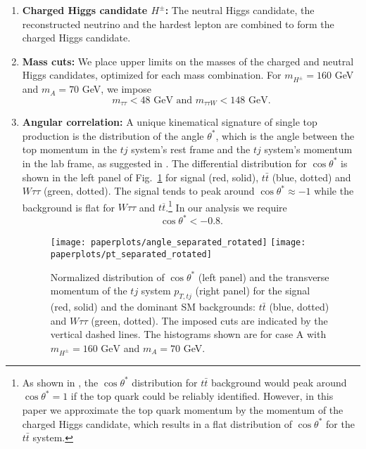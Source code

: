 \begin{enumerate}
\item \textbf{Charged Higgs candidate $H^{\pm}$:} The neutral Higgs candidate, the reconstructed neutrino and the hardest lepton are combined to form the charged Higgs candidate. 

\item \textbf{Mass cuts:} We place upper limits on the masses of the charged and neutral Higgs candidates, optimized for each mass combination. For $m_{H^{\pm}}=160$ GeV and $m_{A}= 70$ GeV, we impose 
\begin{equation}
m_{\tau\tau} < 48 \text{ GeV and } m_{\tau\tau W} < 148 \text{ GeV.}
\label{eqMASS}
\end{equation}
 

 \item \textbf{Angular correlation:} A unique kinematical signature of single top production is the distribution of the angle $\theta^{*}$, which is the angle between the top momentum in the $tj$ system's rest frame and the $tj$ system's momentum in the lab frame, as suggested in \cite{Kling:2012up}. The differential distribution for $\cos\theta^{*}$ is shown in the left panel of Fig.~\ref{fig:fig3} for signal (red, solid), $t\bar{t}$ (blue, dotted) and $W\tau\tau$ (green, dotted). The signal tends to peak around $\cos\theta^* \approx -1$ while the background is flat for $W\tau\tau$ and $t\overline{t}$.\footnote{As shown in \cite{Kling:2012up}, the $\cos\theta^{*}$ distribution for $t\bar{t}$ background would peak around $\cos\theta^{*}=1$ if the top quark could be reliably identified. However, in this paper we approximate the top quark momentum by the momentum of the charged Higgs candidate, which results in a flat distribution of $\cos\theta^*$ for the $t\bar{t}$ system. } In our analysis we require 
\begin{equation}
 \cos\theta^*< -0.8.
\label{eqT}
\end{equation}

\begin{figure}[htbp]
\centering
\texttt{[image: paperplots/angle\_separated\_rotated]}\hfill
 \texttt{[image: paperplots/pt\_separated\_rotated]}
 \caption{Normalized distribution of $\cos\theta^*$ (left panel) and the transverse momentum of the $tj$ system $p_{T,tj}$ (right panel) for the signal (red, solid) and the dominant SM backgrounds: $t\bar{t}$ (blue, dotted) and $W\tau\tau$ (green, dotted). The imposed cuts are indicated by the vertical dashed lines. The histograms shown are for case A with $m_{H^{\pm}}=160\text{ GeV}$ and $m_A=70$ GeV.}
\label{fig:fig3}
\end{figure}


\end{enumerate}
